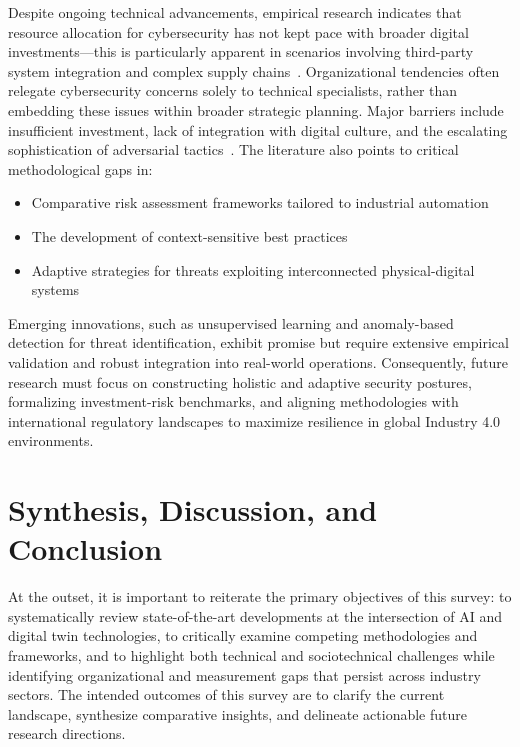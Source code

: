 \documentclass[sigconf]{acmart}
\begin{document}
Despite ongoing technical advancements, empirical research indicates that resource allocation for cybersecurity has not kept pace with broader digital investments—this is particularly apparent in scenarios involving third-party system integration and complex supply chains~\cite{ref35}. Organizational tendencies often relegate cybersecurity concerns solely to technical specialists, rather than embedding these issues within broader strategic planning. Major barriers include insufficient investment, lack of integration with digital culture, and the escalating sophistication of adversarial tactics~\cite{ref35}. The literature also points to critical methodological gaps in:

\begin{itemize}
  \item Comparative risk assessment frameworks tailored to industrial automation
  \item The development of context-sensitive best practices
  \item Adaptive strategies for threats exploiting interconnected physical-digital systems~\cite{ref10}
\end{itemize}

Emerging innovations, such as unsupervised learning and anomaly-based detection for threat identification, exhibit promise but require extensive empirical validation and robust integration into real-world operations. Consequently, future research must focus on constructing holistic and adaptive security postures, formalizing investment-risk benchmarks, and aligning methodologies with international regulatory landscapes to maximize resilience in global Industry 4.0 environments.

\section{Synthesis, Discussion, and Conclusion}

At the outset, it is important to reiterate the primary objectives of this survey: to systematically review state-of-the-art developments at the intersection of AI and digital twin technologies, to critically examine competing methodologies and frameworks, and to highlight both technical and sociotechnical challenges while identifying organizational and measurement gaps that persist across industry sectors. The intended outcomes of this survey are to clarify the current landscape, synthesize comparative insights, and delineate actionable future research directions.
\end{document}
